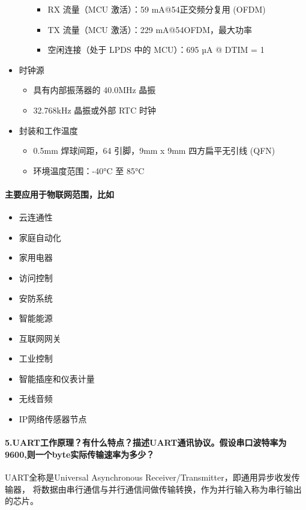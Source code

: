 \documentclass[a4paper]{ctexart}
\begin{document}
\begin{itemize}
\begin{itemize}
\begin{itemize}
        \item RX 流量（MCU 激活）：59 mA@54正交频分复用 (OFDM)
        \item TX 流量（MCU 激活）：229 mA@54OFDM，最大功率
        \item 空闲连接（处于 LPDS 中的 MCU）：695 µA @ DTIM = 1
      \end{itemize}
    \end{itemize}
    \item 时钟源
    \begin{itemize}
      \item 具有内部振荡器的 40.0MHz 晶振
      \item 32.768kHz 晶振或外部 RTC 时钟
    \end{itemize}
    \item 封装和工作温度
    \begin{itemize}
      \item 0.5mm 焊球间距，64 引脚，9mm x 9mm 四方扁平无引线 (QFN)
      \item 环境温度范围：-40°C 至 85°C
    \end{itemize}
  \end{itemize}

  \paragraph*{主要应用于物联网范围，比如}
  \begin{itemize}
    \item 云连通性
    \item 家庭自动化
    \item 家用电器
    \item 访问控制
    \item 安防系统
    \item 智能能源
    \item 互联网网关
    \item 工业控制
    \item 智能插座和仪表计量
    \item 无线音频
    \item IP网络传感器节点
  \end{itemize}

  \paragraph{5.UART工作原理？有什么特点？描述UART通讯协议。假设串口波特率为9600,则一个byte实际传输速率为多少？\\}
  \quad UART全称是Universal Asynchronous Receiver/Transmitter，即通用异步收发传输器，
  将数据由串行通信与并行通信间做传输转换，作为并行输入称为串行输出的芯片。
\end{document}
